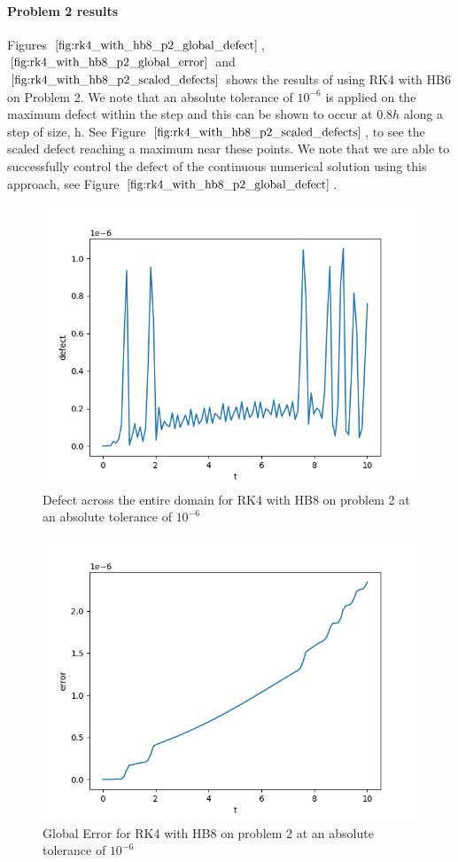 \paragraph{Problem 2 results}
Figures $\ref{fig:rk4_with_hb8_p2_global_defect}$, $\ref{fig:rk4_with_hb8_p2_global_error}$ and $\ref{fig:rk4_with_hb8_p2_scaled_defects}$ shows the results of using RK4 with HB6 on Problem 2. We note that an absolute tolerance of $10^{-6}$ is applied on the maximum defect within the step and this can be shown to occur at $0.8h$ along a step of size, h. See Figure $\ref{fig:rk4_with_hb8_p2_scaled_defects}$, to see the scaled defect reaching a maximum near these points. We note that we are able to successfully control the defect of the continuous numerical solution using this approach, see Figure $\ref{fig:rk4_with_hb8_p2_global_defect}$. 

\begin{figure}[H]
\centering
\includegraphics[width=0.7\linewidth]{./figures/rk4_with_hb8_p2_global_defect}
\caption{Defect across the entire domain for RK4 with HB8 on problem 2 at an absolute tolerance of $10^{-6}$}
\label{fig:rk4_with_hb8_p2_global_defect}
\end{figure}

\begin{figure}[H]
\centering
\includegraphics[width=0.7\linewidth]{./figures/rk4_with_hb8_p2_global_error}
\caption{Global Error for RK4 with HB8 on problem 2 at an absolute tolerance of $10^{-6}$}
\label{fig:rk4_with_hb8_p2_global_error}
\end{figure}

